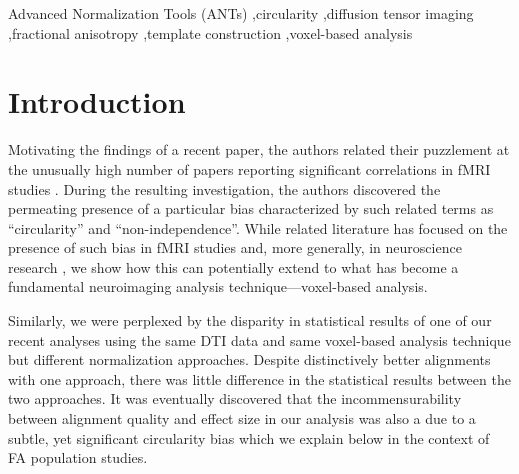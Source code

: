\documentclass[final,5p,times,twocolumn]{elsarticle}
\begin{document}
\begin{frontmatter}
\begin{keyword}
Advanced Normalization Tools (ANTs) \sep circularity \sep diffusion tensor imaging \sep fractional anisotropy \sep template construction \sep voxel-based analysis
\end{keyword}

\end{frontmatter}
%
%
\newpage





\section{Introduction}
Motivating the findings of a recent paper, the authors related their
puzzlement at the unusually high number of papers reporting 
significant correlations in fMRI studies \citep{Vul2009}. During the 
resulting investigation, the authors discovered the permeating
presence of a particular bias characterized by such related terms as ``circularity''
and ``non-independence''.
While related literature has focused on the presence of such bias in 
fMRI studies \citep{Vul2009,Vul2010} and, more generally, in neuroscience research 
\citep{Kriegeskorte2009}, we show how this can potentially extend to what has
become a fundamental neuroimaging analysis technique---voxel-based analysis.

Similarly, we were perplexed by the disparity in statistical results of one of 
our recent analyses \citep{Stone2011} using the same DTI data and same 
voxel-based analysis technique but different normalization approaches.  Despite 
distinctively better alignments with one approach, there was little 
difference in the statistical results between the two approaches.  
It was eventually discovered that the 
incommensurability between alignment quality and effect size in our
analysis was also a due to a subtle, yet significant circularity bias
which we explain below in the context of FA population studies.  

\end{document}
